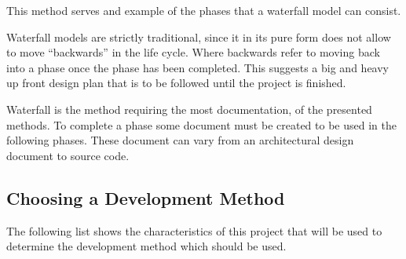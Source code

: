 This method serves and example of the phases that a waterfall model can consist.

Waterfall models are strictly traditional, since it in its pure form does not allow to move ``backwards'' in the life cycle.
Where backwards refer to moving back into a phase once the phase has been completed.
This suggests a big and heavy up front design plan that is to be followed until the project is finished.

Waterfall is the method requiring the most documentation, of the presented methods.
To complete a phase some document must be created to be used in the following phases.
These document can vary from an architectural design document to source code.

\subsection{Choosing a Development Method}
\label{subsec:choosingmethod}
The following list shows the characteristics of this project that will be used to determine the development method which should be used.
